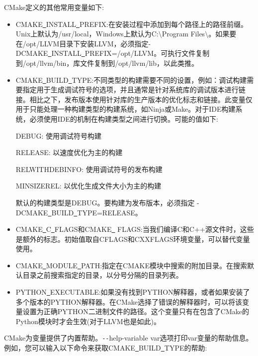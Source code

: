 CMake定义的其他常用变量如下:\par

\begin{itemize}
\item CMAKE\underline{~}INSTALL\underline{~}PREFIX:在安装过程中添加到每个路径上的路径前缀。Unix上默认为\allowbreak /usr/local，Windows上默认为C:$\setminus$Program Files$\setminus$。如果要在/opt/LLVM目录下安装LLVM，必须指定-DCMAKE\underline{~}INSTALL\underline{~}PREFIX=/opt/LLVM。可执行文件复制到/opt/llvm/bin，库文件复制到/opt/llvm/lib，以此类推。

\item CMAKE\underline{~}BUILD\underline{~}TYPE:不同类型的构建需要不同的设置，例如：调试构建需要指定用于生成调试符号的选项，并且通常是针对系统库的调试版本进行链接。相比之下，发布版本使用针对库的生产版本的优化标志和链接。此变量仅用于只能处理一种构建类型的构建系统，如Ninja或Make。对于IDE构建系统，必须使用IDE的机制在构建类型之间进行切换。可能的值如下:\par
DEBUG: 使用调试符号构建\par
RELEASE: 以速度优化为主的构建\par
RELWITHDEBINFO: 使用调试符号的发布构建\par
MINSIZEREL: 以优化生成文件大小为主的构建\par
默认的构建类型是DEBUG。要构建为发布版本，必须指定 -DCMAKE\underline{~}BUILD\underline{~}TYPE=RELE\allowbreak ASE。\par

\item CMAKE\underline{~}C\underline{~}FLAGS和CMAKE\underline{~} FLAGS:当我们编译C和C++源文件时，这些是额外的标志。初始值取自CFLAGS和CXXFLAGS环境变量，可以替代变量使用。

\item CMAKE\underline{~}MODULE\underline{~}PATH:指定在CMAKE模块中搜索的附加目录。在搜索默认目录之前搜索指定的目录，以分号分隔的目录列表。

\item PYTHON\underline{~}EXECUTABLE:如果没有找到PYTHON解释器，或者如果安装了多个版本的PYTHON解释器。在CMake选择了错误的解释器时，可以将该变量设置为正确PYTHON二进制文件的路径。这个变量只有在包含了CMake的Python模块时才会生效(对于LLVM也是如此)。
\end{itemize}

CMake为变量提供了内置帮助。\verb|--|help-variable var选项打印var变量的帮助信息。例如，您可以输入以下命令来获取CMAKE\underline{~}BUILD\underline{~}TYPE的帮助:\par

